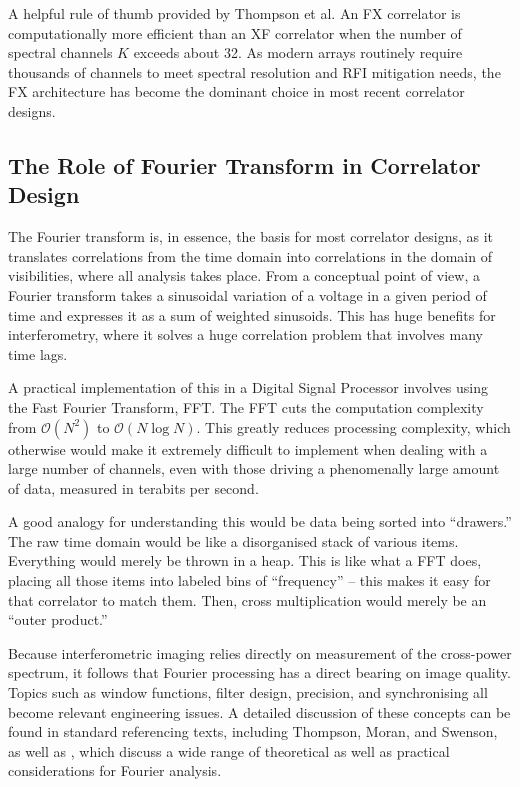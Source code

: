         A helpful rule of thumb provided by Thompson et al. An FX correlator is computationally more efficient than an XF correlator when the number of spectral channels \( K \) exceeds about 32. As modern arrays routinely require thousands of channels to meet spectral resolution and RFI mitigation needs, the FX architecture has become the dominant choice in most recent correlator designs.

    \subsection{The Role of Fourier Transform in Correlator Design}
    The Fourier transform is, in essence, the basis for most correlator designs, as it translates correlations from the time domain into correlations in the domain of visibilities, where all analysis takes place. From a conceptual point of view, a Fourier transform takes a sinusoidal variation of a voltage in a given period of time and expresses it as a sum of weighted sinusoids. This has huge benefits for interferometry, where it solves a huge correlation problem that involves many time lags.

    A practical implementation of this in a Digital Signal Processor involves using the Fast Fourier Transform, FFT. The FFT cuts the computation complexity from $\mathcal{O}(N^2)$ to $\mathcal{O}(N \log N)$. This greatly reduces processing complexity, which otherwise would make it extremely difficult to implement when dealing with a large number of channels, even with those driving a phenomenally large amount of data, measured in terabits per second.
    
    A good analogy for understanding this would be data being sorted into “drawers.” The raw time domain would be like a disorganised stack of various items. Everything would merely be thrown in a heap. This is like what a FFT does, placing all those items into labeled bins of “frequency” – this makes it easy for that correlator to match them. Then, cross multiplication would merely be an “outer product.”
    
    Because interferometric imaging relies directly on measurement of the cross-power spectrum, it follows that Fourier processing has a direct bearing on image quality. Topics such as window functions, filter design, precision, and synchronising all become relevant engineering issues. A detailed discussion of these concepts can be found in standard referencing texts, including Thompson, Moran, and Swenson, as well as \cite{Thompson2001, Oppenheim1999}, which discuss a wide range of theoretical as well as practical considerations for Fourier analysis.

